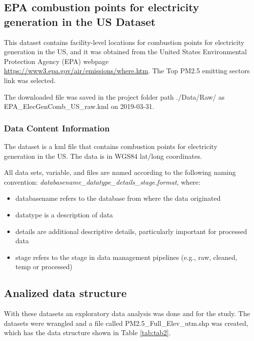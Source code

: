 \documentclass[12pt,]{article}
\begin{document}
\subsection{EPA combustion points for electricity generation in the US
Dataset}\label{epa-combustion-points-for-electricity-generation-in-the-us-dataset}

This dataset contains facility-level locations for combustion points for
electricity generation in the US, and it was obtained from the United
States Environmental Protection Agency (EPA) webpage
\url{https://www3.epa.gov/air/emissions/where.htm}. The Top PM2.5
emitting sectors link was selected.

The downloaded file was saved in the project folder path ./Data/Raw/ as
EPA\_ElecGenComb\_US\_raw.kml on 2019-03-31.

\subsubsection{Data Content
Information}\label{data-content-information-4}

The dataset is a kml file that contains combustion points for
electricity generation in the US. The data is in WGS84 lat/long
coordinates.

All data sets, variable, and files are named according to the following
naming convention: \emph{databasename\_datatype\_details\_stage.format},
where:

\begin{itemize}
\item
  databasename refers to the database from where the data originated
\item
  datatype is a description of data
\item
  details are additional descriptive details, particularly important for
  processed data
\item
  stage refers to the stage in data management pipelines (e.g., raw,
  cleaned, temp or processed)
\end{itemize}

\subsection{Analized data structure}\label{analized-data-structure}

With these datasets an exploratory data analysis was done and for the
study. The datasets were wrangled and a file called
PM2.5\_Full\_Elev\_utm.shp was created, which has the data structure
shown in Table \ref{tab:tab2}.
\end{document}
